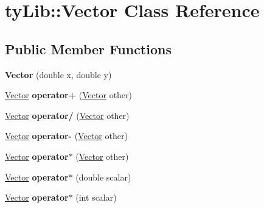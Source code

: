 \hypertarget{classty_lib_1_1_vector}{}\section{ty\+Lib\+:\+:Vector Class Reference}
\label{classty_lib_1_1_vector}
\subsection*{Public Member Functions}
\begin{DoxyCompactItemize}
\item 
\hypertarget{classty_lib_1_1_vector_a7f7a6d4ee83b0c24a71892f635fcf63f}{}{\bfseries Vector} (double x, double y)\label{classty_lib_1_1_vector_a7f7a6d4ee83b0c24a71892f635fcf63f}

\item 
\hypertarget{classty_lib_1_1_vector_a849dd00fe99bb70144c9dbd8468c416c}{}\hyperlink{classty_lib_1_1_vector}{Vector} {\bfseries operator+} (\hyperlink{classty_lib_1_1_vector}{Vector} other)\label{classty_lib_1_1_vector_a849dd00fe99bb70144c9dbd8468c416c}

\item 
\hypertarget{classty_lib_1_1_vector_a27f2cdd0e9b0514cb213f22eca6ef5a9}{}\hyperlink{classty_lib_1_1_vector}{Vector} {\bfseries operator/} (\hyperlink{classty_lib_1_1_vector}{Vector} other)\label{classty_lib_1_1_vector_a27f2cdd0e9b0514cb213f22eca6ef5a9}

\item 
\hypertarget{classty_lib_1_1_vector_acf7ab5a61ab52bc327e137ca563cd7e2}{}\hyperlink{classty_lib_1_1_vector}{Vector} {\bfseries operator-\/} (\hyperlink{classty_lib_1_1_vector}{Vector} other)\label{classty_lib_1_1_vector_acf7ab5a61ab52bc327e137ca563cd7e2}

\item 
\hypertarget{classty_lib_1_1_vector_abf144f1845af8a7e0077c04ca57ed0d4}{}\hyperlink{classty_lib_1_1_vector}{Vector} {\bfseries operator$\ast$} (\hyperlink{classty_lib_1_1_vector}{Vector} other)\label{classty_lib_1_1_vector_abf144f1845af8a7e0077c04ca57ed0d4}

\item 
\hypertarget{classty_lib_1_1_vector_aa29cb241db1c80cd58a86367f423c246}{}\hyperlink{classty_lib_1_1_vector}{Vector} {\bfseries operator$\ast$} (double scalar)\label{classty_lib_1_1_vector_aa29cb241db1c80cd58a86367f423c246}

\item 
\hypertarget{classty_lib_1_1_vector_af40779830238d3e2041d441be106005a}{}\hyperlink{classty_lib_1_1_vector}{Vector} {\bfseries operator$\ast$} (int scalar)\label{classty_lib_1_1_vector_af40779830238d3e2041d441be106005a}


\end{DoxyCompactItemize}
